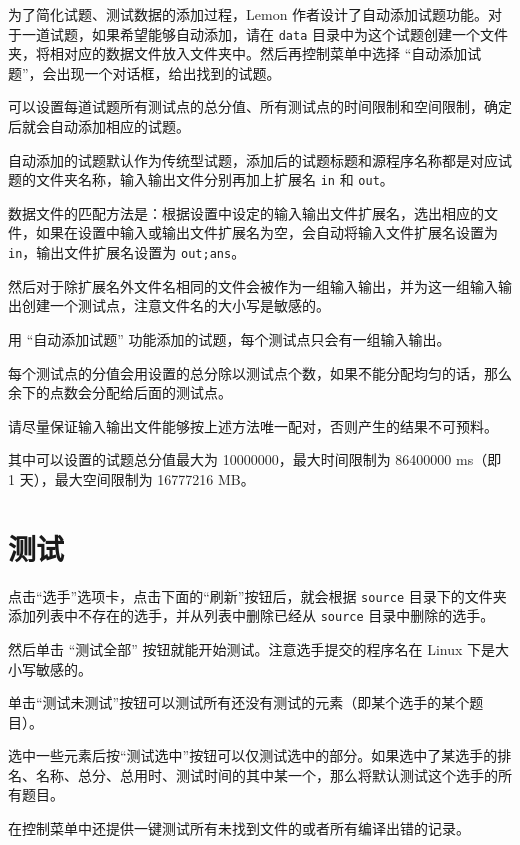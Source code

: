 \documentclass[UTF-8]{ctexart}
\begin{document}
			为了简化试题、测试数据的添加过程，Lemon 作者设计了自动添加试题功能。对于一道试题，如果希望能够自动添加，请在 \texttt{data} 目录中为这个试题创建一个文件夹，将相对应的数据文件放入文件夹中。然后再控制菜单中选择 “自动添加试题”，会出现一个对话框，给出找到的试题。
			
			可以设置每道试题所有测试点的总分值、所有测试点的时间限制和空间限制，确定后就会自动添加相应的试题。
			
			自动添加的试题默认作为传统型试题，添加后的试题标题和源程序名称都是对应试题的文件夹名称，输入输出文件分别再加上扩展名 \texttt{in} 和 \texttt{out}。
			
			数据文件的匹配方法是：根据设置中设定的输入输出文件扩展名，选出相应的文件，如果在设置中输入或输出文件扩展名为空，会自动将输入文件扩展名设置为 \texttt{in}，输出文件扩展名设置为 \texttt{out;ans}。
			
			然后对于除扩展名外文件名相同的文件会被作为一组输入输出，并为这一组输入输出创建一个测试点，注意文件名的大小写是敏感的。
			
			用 “自动添加试题” 功能添加的试题，每个测试点只会有一组输入输出。
			
			每个测试点的分值会用设置的总分除以测试点个数，如果不能分配均匀的话，那么余下的点数会分配给后面的测试点。
			
			请尽量保证输入输出文件能够按上述方法唯一配对，否则产生的结果不可预料。
			
			其中可以设置的试题总分值最大为 10000000，最大时间限制为 86400000 ms（即 1 天），最大空间限制为 16777216 MB。
			
	\newpage
		
	\section{测试}
			
		点击“选手”选项卡，点击下面的“刷新”按钮后，就会根据 \texttt{source} 目录下的文件夹添加列表中不存在的选手，并从列表中删除已经从 \texttt{source} 目录中删除的选手。
		
		然后单击 “测试全部” 按钮就能开始测试。注意选手提交的程序名在 Linux 下是大小写敏感的。
		
		单击“测试未测试”按钮可以测试所有还没有测试的元素（即某个选手的某个题目）。
		
		选中一些元素后按“测试选中”按钮可以仅测试选中的部分。如果选中了某选手的排名、名称、总分、总用时、测试时间的其中某一个，那么将默认测试这个选手的所有题目。
		
		在控制菜单中还提供一键测试所有未找到文件的或者所有编译出错的记录。
		
\end{document}
